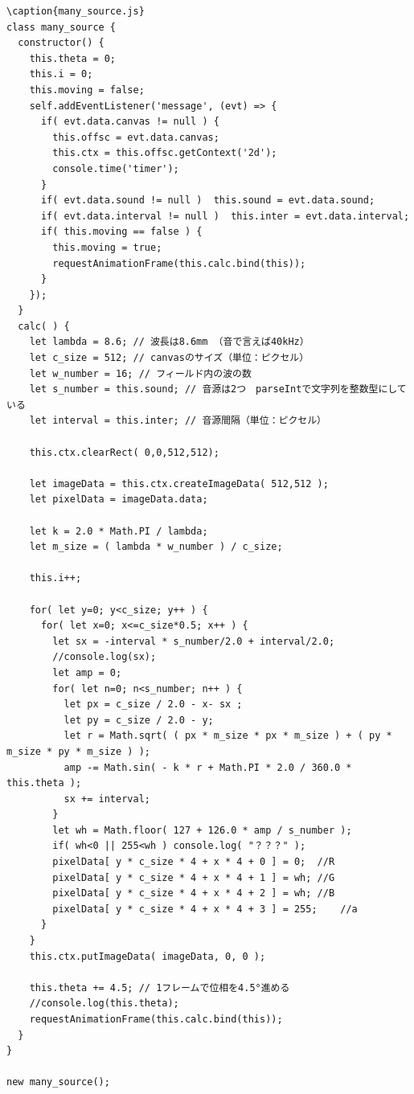\documentclass[a4j,12pt]{jsarticle}
\begin{document}
\begin{lstlisting}
\caption{many_source.js}
class many_source {
  constructor() {
    this.theta = 0;
    this.i = 0;
    this.moving = false;
    self.addEventListener('message', (evt) => {
      if( evt.data.canvas != null ) {
        this.offsc = evt.data.canvas;
        this.ctx = this.offsc.getContext('2d');
        console.time('timer');
      }
      if( evt.data.sound != null )  this.sound = evt.data.sound;
      if( evt.data.interval != null )  this.inter = evt.data.interval;
      if( this.moving == false ) {
        this.moving = true;
        requestAnimationFrame(this.calc.bind(this));
      }
    });
  }
  calc( ) {
    let lambda = 8.6; // 波長は8.6mm （音で言えば40kHz）
    let c_size = 512; // canvasのサイズ（単位：ピクセル）
    let w_number = 16; // フィールド内の波の数
    let s_number = this.sound; // 音源は2つ　parseIntで文字列を整数型にしている
    let interval = this.inter; // 音源間隔（単位：ピクセル）

    this.ctx.clearRect( 0,0,512,512);

    let imageData = this.ctx.createImageData( 512,512 );
    let pixelData = imageData.data;

    let k = 2.0 * Math.PI / lambda;
    let m_size = ( lambda * w_number ) / c_size;

    this.i++;

    for( let y=0; y<c_size; y++ ) {
      for( let x=0; x<=c_size*0.5; x++ ) {
        let sx = -interval * s_number/2.0 + interval/2.0;
        //console.log(sx);
        let amp = 0;
        for( let n=0; n<s_number; n++ ) {
          let px = c_size / 2.0 - x- sx ;
          let py = c_size / 2.0 - y;
          let r = Math.sqrt( ( px * m_size * px * m_size ) + ( py * m_size * py * m_size ) );
          amp -= Math.sin( - k * r + Math.PI * 2.0 / 360.0 * this.theta );
          sx += interval;
        }
        let wh = Math.floor( 127 + 126.0 * amp / s_number );
        if( wh<0 || 255<wh ) console.log( "？？？" );
        pixelData[ y * c_size * 4 + x * 4 + 0 ] = 0;  //R
        pixelData[ y * c_size * 4 + x * 4 + 1 ] = wh; //G
        pixelData[ y * c_size * 4 + x * 4 + 2 ] = wh; //B
        pixelData[ y * c_size * 4 + x * 4 + 3 ] = 255;    //a
      }
    }
    this.ctx.putImageData( imageData, 0, 0 );

    this.theta += 4.5; // 1フレームで位相を4.5°進める
    //console.log(this.theta);
    requestAnimationFrame(this.calc.bind(this));
  }
}

new many_source();

\end{lstlisting}
\newpage
\end{document}
